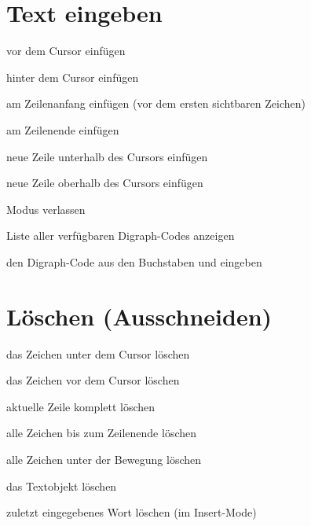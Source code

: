 \documentclass
[
  draft    = true,
  fontsize = 11pt,
  parskip  = half,
  BCOR     = 0pt,
  DIV      = calc,
  ngerman
]
{scrartcl}
\begin{document}
\section{Text eingeben}
\begin{mytemize}
  \renewcommand{\cmdwidth}{5em}%
  \item {}         vor dem Cursor einfügen
  \item {}         hinter dem Cursor einfügen
  \item {}         am Zeilenanfang einfügen (vor dem ersten sichtbaren Zeichen)
  \item {}         am Zeilenende einfügen
  \item {}         neue Zeile unterhalb des Cursors einfügen
  \item {}         neue Zeile oberhalb des Cursors einfügen
  \item {}     Modus verlassen
  \item {} Liste aller verfügbaren Digraph-Codes anzeigen
  \item {}   den Digraph-Code aus den Buchstaben  und  eingeben
\end{mytemize}

\section{Löschen (Ausschneiden)}
\begin{mytemize}
  \item {}   das Zeichen unter dem Cursor löschen
  \item {}   das Zeichen vor dem Cursor löschen
  \item {}  aktuelle Zeile komplett löschen
  \item {}   alle Zeichen bis zum Zeilenende löschen
  \item {}  alle Zeichen unter der Bewegung  löschen
  \item {}  das Textobjekt  löschen
  \item {} zuletzt eingegebenes Wort löschen (im Insert-Mode)
\end{mytemize}

\end{document}
